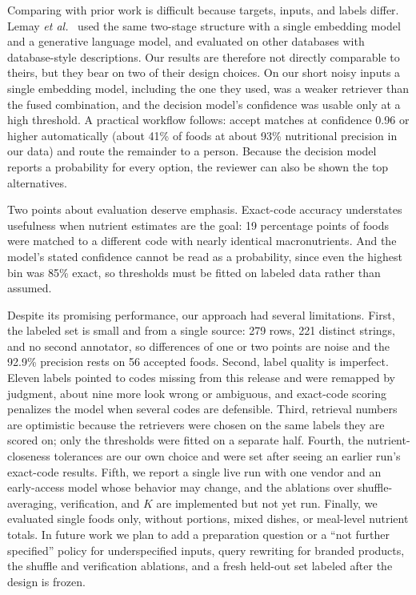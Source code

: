 \documentclass[11pt,journal,onecolumn]{IEEEtran}
\begin{document}
Comparing with prior work is difficult because targets, inputs, and labels differ. Lemay \emph{et al.}~\cite{lemay} used the same two-stage structure with a single embedding model and a generative language model, and evaluated on other databases with database-style descriptions. Our results are therefore not directly comparable to theirs, but they bear on two of their design choices. On our short noisy inputs a single embedding model, including the one they used, was a weaker retriever than the fused combination, and the decision model's confidence was usable only at a high threshold. A practical workflow follows: accept matches at confidence 0.96 or higher automatically (about 41\% of foods at about 93\% nutritional precision in our data) and route the remainder to a person. Because the decision model reports a probability for every option, the reviewer can also be shown the top alternatives.

Two points about evaluation deserve emphasis. Exact-code accuracy understates usefulness when nutrient estimates are the goal: 19 percentage points of foods were matched to a different code with nearly identical macronutrients. And the model's stated confidence cannot be read as a probability, since even the highest bin was 85\% exact, so thresholds must be fitted on labeled data rather than assumed.

Despite its promising performance, our approach had several limitations. First, the labeled set is small and from a single source: 279 rows, 221 distinct strings, and no second annotator, so differences of one or two points are noise and the 92.9\% precision rests on 56 accepted foods. Second, label quality is imperfect. Eleven labels pointed to codes missing from this release and were remapped by judgment, about nine more look wrong or ambiguous, and exact-code scoring penalizes the model when several codes are defensible. Third, retrieval numbers are optimistic because the retrievers were chosen on the same labels they are scored on; only the thresholds were fitted on a separate half. Fourth, the nutrient-closeness tolerances are our own choice and were set after seeing an earlier run's exact-code results. Fifth, we report a single live run with one vendor and an early-access model whose behavior may change, and the ablations over shuffle-averaging, verification, and $K$ are implemented but not yet run. Finally, we evaluated single foods only, without portions, mixed dishes, or meal-level nutrient totals. In future work we plan to add a preparation question or a ``not further specified'' policy for underspecified inputs, query rewriting for branded products, the shuffle and verification ablations, and a fresh held-out set labeled after the design is frozen.
\end{document}
